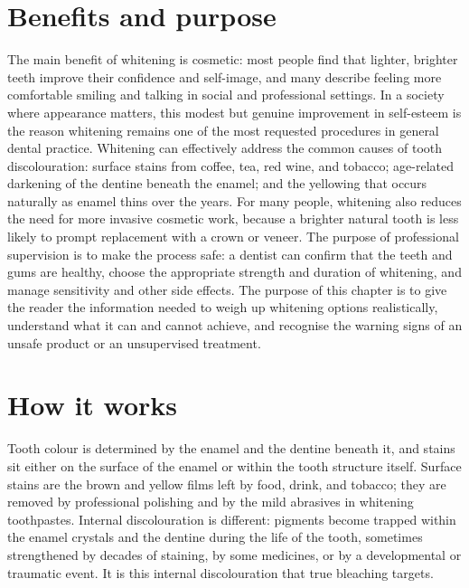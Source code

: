 \section*{Benefits and purpose}
The main benefit of whitening is cosmetic: most people find that lighter, brighter teeth improve their confidence and self-image, and many describe feeling more comfortable smiling and talking in social and professional settings. In a society where appearance matters, this modest but genuine improvement in self-esteem is the reason whitening remains one of the most requested procedures in general dental practice. Whitening can effectively address the common causes of tooth discolouration: surface stains from coffee, tea, red wine, and tobacco; age-related darkening of the dentine beneath the enamel; and the yellowing that occurs naturally as enamel thins over the years. For many people, whitening also reduces the need for more invasive cosmetic work, because a brighter natural tooth is less likely to prompt replacement with a crown or veneer. The purpose of professional supervision is to make the process safe: a dentist can confirm that the teeth and gums are healthy, choose the appropriate strength and duration of whitening, and manage sensitivity and other side effects. The purpose of this chapter is to give the reader the information needed to weigh up whitening options realistically, understand what it can and cannot achieve, and recognise the warning signs of an unsafe product or an unsupervised treatment.

\section*{How it works}
Tooth colour is determined by the enamel and the dentine beneath it, and stains sit either on the surface of the enamel or within the tooth structure itself. Surface stains are the brown and yellow films left by food, drink, and tobacco; they are removed by professional polishing and by the mild abrasives in whitening toothpastes. Internal discolouration is different: pigments become trapped within the enamel crystals and the dentine during the life of the tooth, sometimes strengthened by decades of staining, by some medicines, or by a developmental or traumatic event. It is this internal discolouration that true bleaching targets.

